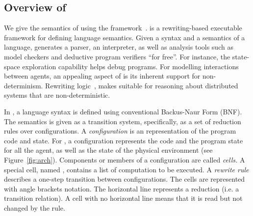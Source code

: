  \subsection{Overview of \K}
 We give the semantics of \rolang using the \K framework~\cite{rosu-serbanuta-2013-k}.
 \K is a rewriting-based executable framework for defining language semantics.
 Given a syntax and a semantics of a language, \K generates a parser, an interpreter, as well as analysis tools such as model checkers and deductive program verifiers ``for free''.
  For instance, the state-space exploration capability helps debug \rolang programs.
  For modelling interactions between agents, an appealing aspect of \K is its inherent support for non-determinism.
  Rewriting logic~\cite{meseguer2007rewriting}, makes \K suitable for reasoning about distributed systems that are  non-deterministic. 

 
 In \K, a language syntax is defined using conventional Backus-Naur Form (BNF).
 The semantics is given as a transition system, specifically, as a set of reduction rules over  configurations.
 A {\em configuration\/} is an  representation of the program code and state.
 For \rolang, a configuration represents the code and the program state for all the agent, as well as the state of the physical environment (see Figure~\ref{fig:arch}). 
 Components or members of a configuration are called {\em cells.}
 A special cell, named , contains a list of computation to be executed.
A {\em rewrite rule\/} describes a one-step transition between configurations. 
 The cells are represented with angle brackets notation.
 The horizontal line represents a reduction
 (i.e. a transition relation).
 A cell with no horizontal line means that it is read but not changed by the rule.
 
 
 


